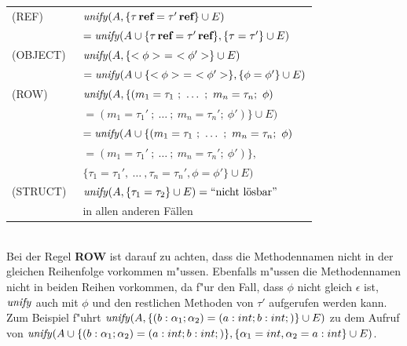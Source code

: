 \begin{tabular}{ll}
  (REF)\      & ${\text{\it unify\/}}(A,\{\tau\,\textbf{ref} = \tau'\,\textbf{ref} \} \cup E)$\\[1mm]
              & \quad $= {\text{\it unify\/}}(A \cup \{\tau\,\textbf{ref} = \tau'\,\textbf{ref} \},
                         \{\tau = \tau' \} \cup E)$\\[3mm]
  (OBJECT)\   & ${\text{\it unify\/}}(A,\{<\phi>\ =\ <\phi'> \} \cup E)$\\[1mm]
              & \quad $= {\text{\it unify\/}}(A \cup \{<\phi>\ =\ <\phi'> \},
                         \{\phi = \phi' \} \cup E)$\\[3mm]
  (ROW)\      & ${\text{\it unify\/}}(A,\{ (m_1 = \tau_1\ ;\ \ldots\ ;\ m_n = \tau_n;\ \phi)$\\
              & \quad $= (m_1 = \tau_1'\ ;\ \ldots\ ;\ m_n = \tau_n';\ \phi') \} \cup E)$\\[1mm]
              & \quad $= {\text{\it unify\/}}(A \cup \{ (m_1 = \tau_1\ ;\ \ldots\ ;\ m_n = \tau_n;\ \phi)$\\
              & \quad \quad $= (m_1 = \tau_1'\ ;\ \ldots\ ;\ m_n = \tau_n';\ \phi') \},$\\
              & \quad \quad \quad $\{\tau_1 = \tau_1', \ \ldots\ ,\tau_n = \tau_n',
                \phi = \phi' \} \cup E)$\\[3mm]
  (STRUCT)\   & ${\text{\it unify\/}}(A,\{\tau_1 = \tau_2\} \cup E) = \mbox{``nicht l\"osbar''}$\\[1mm]
              & in  allen anderen F\"allen
\end{tabular}\\[6mm]
Bei der Regel {\bf ROW} ist darauf zu achten, dass die Methodennamen nicht in der gleichen Reihenfolge
vorkommen m"ussen. Ebenfalls m"ussen die Methodennamen nicht in beiden Reihen vorkommen, da f"ur den Fall, 
dass $\phi$ nicht gleich $\epsilon$ ist, ${\text{\it unify\/}}$ auch mit $\phi$ und den restlichen Methoden von $\tau'$ 
aufgerufen werden kann. Zum Beispiel f"uhrt ${\text{\it unify\/}} (A,\{ (b: \alpha_1 ; \alpha_2) = (a: int ; b: int ;)\}
\cup E)$ zu dem Aufruf von ${\text{\it unify\/}} (A \cup \{ (b: \alpha_1 ; \alpha_2) = (a: int ; b: int ;)\},
\{\alpha_1 = int, \alpha_2 = a: int\} \cup E)$.


